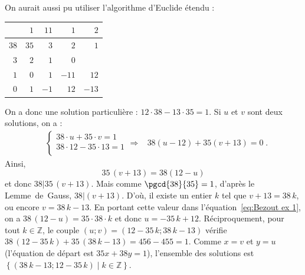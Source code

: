 \begin{ex}
                  On aurait aussi pu utiliser l'algorithme d'Euclide \'etendu :
                  \begin{center}
							\begin{tabular}{|r|r|r|r|r|} \hline
							  & $1$ & $11$ & $1$ & $2$ \\ \hline
							$38$ & $35$ & $3$ & $2$ & $1$ \\ \hline
							$3$ & $2$ & $1$ & $0$ &   \\ \hline
							$1$ & $0$ & $1$ & $-11$ & $12$ \\ \hline
							$0$ & $1$ & $-1$ & $12$ & $-13$ \\ \hline
							\end{tabular}
                  \end{center}
                  
                  On a donc une solution particuli\`ere : $12 \cdot 38 - 13 \cdot 35 = 1$.
                  Si $u$ et $v$ sont deux solutions, on a : 
                        \begin{align*}
                        &
                              \left\lbrace
                                    \begin{array}{l}
                                          38 \cdot  u + 35 \cdot v  = 1 \\
                                          38 \cdot 12 - 35 \cdot 13 = 1 \\
                                    \end{array}
                              \right.
                        \Rightarrow
                        &     
                                    38 (u - 12) + 35 (v + 13) = 0      \;.
                        \end{align*}
                        Ainsi,
                              \begin{equation}
                                    35 \, (v + 13) = 38 (12 - u) \label{eq:Bezout ex 1}
                              \end{equation}
                        et donc $38 | 35 \, (v + 13)$.
                        Mais comme $\pgcd{38}{35} = 1$, d'apr\`es le Lemme~de~Gauss, $38 | (v + 13)$.
                        D'o\`u, il existe un entier $k$ tel que $v + 13 = 38 \, k$, ou encore $v = 38\,k - 13$.
                        En portant cette valeur dans l'\'equation~\eqref{eq:Bezout ex 1}, on a 
                              $38 \, (12 - u) = 35 \cdot 38 \cdot k$ et donc 
                              $u = - 35 \, k + 12$.
                        R\'eciproquement, pour tout $k\in\mathbb{Z}$, le couple $(u ; v) = (12 - 35\,k ; 38\,k - 13)$ v\'erifie
                        $38\,(12-35\,k) + 35\,(38\,k-13) = 456 - 455 = 1$.
                        Comme $x = v$ et $y = u$ (l'\'equation de d\'epart est $35 x + 38 y = 1$),
                        l'ensemble des solutions est
                              $\left\lbrace (38\,k-13 ; 12-35\,k) \mid k \in \mathbb{Z} \right\rbrace$.
            \end{ex}
